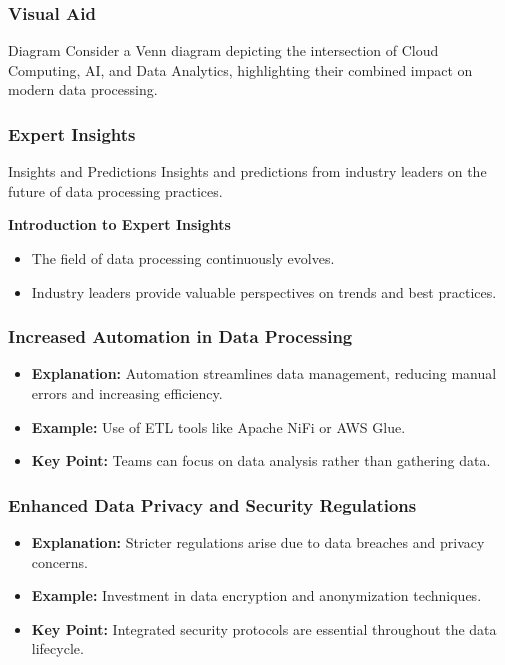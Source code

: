 \documentclass{beamer}
\begin{document}
\begin{frame}[fragile]
    \frametitle{Visual Aid}
    \begin{block}{Diagram}
        Consider a Venn diagram depicting the intersection of Cloud Computing, AI, and Data Analytics, highlighting their combined impact on modern data processing.
    \end{block}
\end{frame}

\begin{frame}[fragile]
    \frametitle{Expert Insights}
    \begin{block}{Insights and Predictions}
        Insights and predictions from industry leaders on the future of data processing practices.
    \end{block}
    
    \textbf{Introduction to Expert Insights}
    \begin{itemize}
        \item The field of data processing continuously evolves.
        \item Industry leaders provide valuable perspectives on trends and best practices.
    \end{itemize}
\end{frame}

\begin{frame}[fragile]
    \frametitle{Increased Automation in Data Processing}
    \begin{itemize}
        \item \textbf{Explanation:} Automation streamlines data management, reducing manual errors and increasing efficiency.
        \item \textbf{Example:} Use of ETL tools like Apache NiFi or AWS Glue.
        \item \textbf{Key Point:} Teams can focus on data analysis rather than gathering data.
    \end{itemize}
\end{frame}

\begin{frame}[fragile]
    \frametitle{Enhanced Data Privacy and Security Regulations}
    \begin{itemize}
        \item \textbf{Explanation:} Stricter regulations arise due to data breaches and privacy concerns.
        \item \textbf{Example:} Investment in data encryption and anonymization techniques.
        \item \textbf{Key Point:} Integrated security protocols are essential throughout the data lifecycle.
    \end{itemize}
\end{frame}
\end{document}
